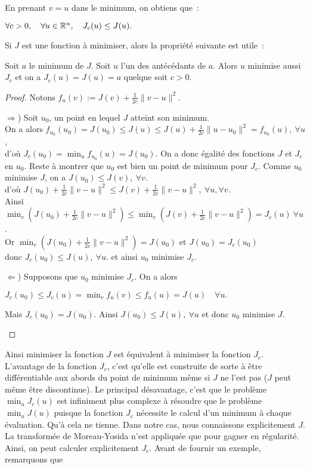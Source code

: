 \documentclass[main.tex]{subfiles}
\begin{document}
En prenant $v=u$ dans le minimum, on obtiens que~:
\begin{prop}
$\forall c>0, \quad \forall u \in \mathbb{R}^n, \quad J_c(u) \leq J(u) .$
\end{prop}
Si $J$ est une fonction à minimiser, alors la propriété suivante est utile~:
\begin{prop}
Soit $a$ le minimum de $J$. Soit $u$ l'un des antécédants de $a$. Alors $u$ minimise aussi $J_c$ et on a $J_c(u)=J(u)=a$ quelque soit $c>0$.
\end{prop}
\begin{proof}Notons $f_u(v) := J(v) + \frac{1}{2c} \| v-u \|^2$.
\begin{myitemize}
\item[$\Rightarrow$)] Soit $u_0$, un point en lequel $J$ atteint son minimum. \\
On a alors $f_{u_0}(u_0) = J(u_0)\leq J(u) \leq J(u) + \frac{1}{2c} \| u-u_0 \|^2  = f_{u_0}(u), \ \forall u $, \\
d'où $J_c(u_0) = \min_u f_{u_0}(u) = J(u_0) $. On a donc égalité des fonctions $J$ et $J_c$ en $u_0$. Reste à montrer que $u_0$ est bien un point de minimum pour $J_c$. Comme $u_0$ minimise $J$, on a $J(u_0)\leq J(v), \ \forall v$. \\
d'où $ J(u_0) + \frac{1}{2c}\|v-u\|^2 \leq J(v) + \frac{1}{2c}\| v-u \|^2, \ \forall u, \forall v$.\\
Ainsi $ \min_v ( J(u_0) + \frac{1}{2c}\|v-u\|^2 ) \leq \min_v ( J(v) + \frac{1}{2c}\| v-u \|^2)=J_c(u) \ \forall u$. \\
Or $\min_v ( J(u_0) + \frac{1}{2c}\|v-u\|^2 )=J(u_0)$ et $J(u_0)=J_c(u_0)$\\ donc $J_c(u_0) \leq J(u), \ \forall u $.
et ainsi $u_0$ minimise $J_c$.
\item[$\Leftarrow$)] Supposons que $u_0$ minimise $J_c$. On a alors
\begin{center}
$J_c(u_0) \leq J_c(u) = \min_v f_u(v) \leq f_u(u) = J(u) \quad \forall u.$
\end{center}
Mais $J_c(u_0) = J(u_0)$. Ainsi $J(u_0) \leq J(u), \ \forall u$ 
et donc $u_0$ minimise $J$.
\end{myitemize}
\end{proof}
Ainsi minimiser la fonction $J$ est équivalent à minimiser la fonction $J_c$. 
L'avantage de la fonction $J_c$, c'est qu'elle est construite de sorte à être  différentiable aux abords du point de minimum même si $J$ ne l'est pas ($J$ peut même être discontinue). Le principal désavantage, c'est que le problème $\min_u J_c(u)$ est infiniment plus complexe à résoudre que le problème $\min_u J(u)$ puisque la fonction $J_c$ nécessite le calcul d'un minimum à chaque évaluation. Qu'à cela ne tienne. Dans notre cas, nous connaissons explicitement $J$. La transformée de Moreau-Yosida n'est appliquée que pour gagner en régularité. Ainsi, on peut calculer explicitement $J_c$. Avant de fournir un exemple, remarquons que 
\end{document}
